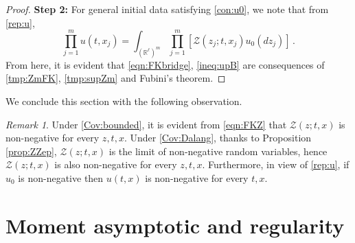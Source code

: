 \documentclass[12pt,reqno]{amsart}
\theoremstyle{remark}
\newtheorem{remark}[theorem]{Remark}
\let\Section=\section
\def\section{\setcounter{equation}{0}\Section}
\newcommand{\1}{\mathbf{1}}
\def\RR{\mathbb{R}}
\def\Z{\mathcal{Z}}
\begin{document}
\begin{proof}
		\textbf{Step 2:} For general initial data satisfying \eqref{con:u0}, we note that from \eqref{rep:u}, %
		\begin{equation*}
			\prod_{j=1}^m u(t,x_j)=\int_{(\RR^\ell)^m}  \prod_{j=1}^m [\Z(z_j;t,x_j) u_{0}(dz_j)]\,.
		\end{equation*}
		From here, it is evident that \eqref{eqn:FKbridge}, \eqref{ineq:upB} are consequences of \eqref{tmp:ZmFK}, \eqref{tmp:supZm} and Fubini's theorem. 
	\end{proof}
	We conclude this section with the following observation.
	\begin{remark}\label{rmk:nonnegative}
		Under \ref{Cov:bounded}, it is evident from \eqref{eqn:FKZ} that $\Z(z;t,x) $ is non-negative for every $z,t,x$. Under \ref{Cov:Dalang}, thanks to Proposition \ref{prop:ZZep}, $\Z(z;t,x)$ is the limit of non-negative random variables, hence $\Z(z;t,x) $ is also non-negative for every $z,t,x$. Furthermore, in view of \eqref{rep:u}, if $u_0$ is non-negative then $u(t,x)$ is non-negative for every $t,x$.
	\end{remark}

\section{Moment asymptotic and regularity} %
\label{sec:moment_asymptotic_and_regularity}
\end{document}
